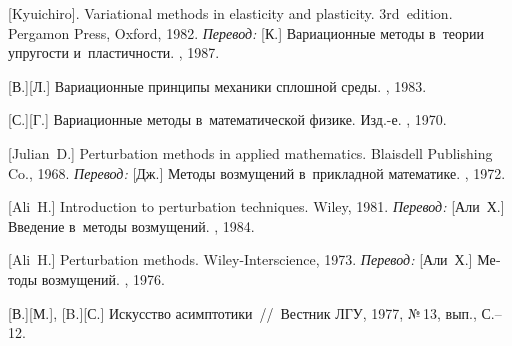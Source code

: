 \begin{thebibliography}{123}
\begin{otherlanguage}{russian}
[Kyuichiro]. Variational methods in elasticity and plasticity. 3rd~edition. Pergamon Press, Oxford, 1982. 
\emph{Перевод:} [К.] Вариационные методы в~теории упругости и~пластичности. \mirpublisher, 1987. 

[В.][Л.] Вариационные принципы механики сплошной среды. \naukapublisher, 1983. 

[С.][Г.] Вариационные методы в~математической физике. Изд.\hbox{-}е. \naukapublisher, 1970. 

%
%



[Julian~D.] Perturbation methods in applied mathematics. Blaisdell Publishing Co., 1968. 
\emph{Перевод:} [Дж.] Методы возмущений в~прикладной математике. \mirpublisher, 1972. 

[Ali~H.] Introduction to perturbation techniques. Wiley, 1981. 
\emph{Перевод:} [Али~Х.] Введение в~методы возмущений. \mirpublisher, 1984. 

[Ali~H.] Perturbation methods. Wiley-Interscience, 1973. 
\emph{Перевод:} [Али~Х.] Методы возмущений. \mirpublisher, 1976. 

[В.][М.], [B.][С.] Искусство асимптотики~//~Вестник ЛГУ, 1977, №\,13, вып., С.\hbox{--}12.


\end{otherlanguage}
\end{thebibliography}
